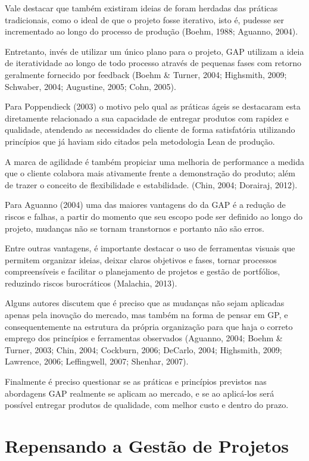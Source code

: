 Vale destacar que também existiram ideias de foram herdadas das práticas tradicionais, como o ideal de que o projeto fosse iterativo, isto é, pudesse ser incrementado ao longo do processo de produção (Boehm, 1988; Aguanno, 2004).

Entretanto, invés de utilizar um único plano para o projeto, GAP utilizam a ideia de iteratividade ao longo de todo processo através de pequenas fases com retorno geralmente fornecido por feedback (Boehm \& Turner, 2004; Highsmith, 2009; Schwaber, 2004; Augustine, 2005; Cohn, 2005).

Para Poppendieck (2003) o motivo pelo qual as práticas ágeis se destacaram esta diretamente relacionado a sua capacidade de entregar produtos com rapidez e qualidade, atendendo as necessidades do cliente de forma satisfatória utilizando princípios que já haviam sido citados pela metodologia Lean de produção.

 A marca de agilidade é também propiciar uma melhoria de performance a medida que o cliente colabora mais ativamente frente a demonstração do produto; além de trazer o conceito de flexibilidade e estabilidade. (Chin, 2004; Dorairaj, 2012).

Para Aguanno (2004) uma das maiores vantagens do da GAP é a redução de riscos e falhas, a partir do momento que seu escopo pode ser definido ao longo do projeto, mudanças não se tornam transtornos e portanto não são erros.

Entre outras vantagens, é importante destacar o uso de ferramentas visuais que permitem organizar ideias, deixar claros objetivos e fases, tornar processos compreensíveis e facilitar o planejamento de projetos e gestão de portfólios, reduzindo riscos burocráticos (Malachia, 2013).

Alguns autores discutem que é preciso que as mudanças não sejam aplicadas apenas pela inovação do mercado, mas também na forma de pensar em GP, e consequentemente na estrutura da própria organização para que haja o correto emprego dos princípios e ferramentas observados (Aguanno, 2004; Boehm \& Turner, 2003; Chin, 2004; Cockburn, 2006; DeCarlo, 2004; Highsmith, 2009; Lawrence, 2006; Leffingwell, 2007; Shenhar, 2007).

Finalmente é preciso questionar se as práticas e princípios previstos nas abordagens GAP realmente se aplicam ao mercado, e se ao aplicá-los será possível entregar produtos de qualidade, com melhor custo e dentro do prazo.

\section{Repensando a Gestão de Projetos}

